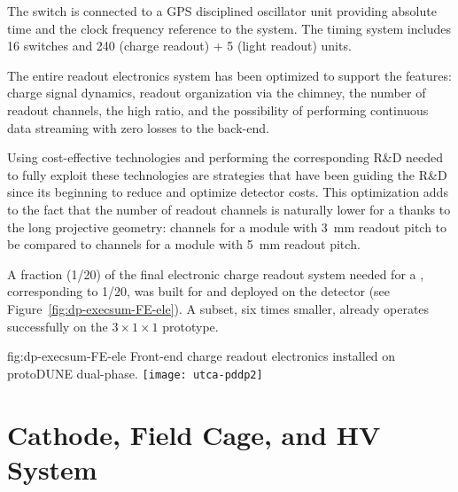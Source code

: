 The  switch is connected to a GPS disciplined oscillator unit providing absolute time and the clock frequency reference to the system. The timing system includes \num{16}  switches and \num{240} (charge readout) + \num{5} (light readout)  units.    

The entire readout electronics system has been optimized to support the  features: charge signal dynamics, readout organization via the chimney, the number of readout channels, the high  ratio, and the possibility of performing continuous data streaming with zero losses to the  back-end. 

Using cost-effective technologies and performing the corresponding R\&D needed to fully exploit these technologies are strategies that have been guiding the R\&D since its beginning to reduce and optimize detector costs.   
This optimization adds to the fact that the number of readout channels is naturally lower for a  thanks to the long projective geometry: \dpnumcrpch channels for a  module with \SI{3}{mm} readout pitch to be compared to \spnumch channels for a  module with \SI{5}{mm} readout pitch. 

A fraction (1/20) of the final electronic charge readout system needed for a   , corresponding to 1/20, was built for  and deployed on the detector (see Figure~\ref{fig:dp-execsum-FE-ele}).  A subset, six times smaller, already operates successfully  on the $3\times 1 \times 1$ prototype.

\begin{dunefigure}{fig:dp-execsum-FE-ele}
  {Front-end charge readout electronics installed on protoDUNE dual-phase.}
  \texttt{[image: utca-pddp2]}
\end{dunefigure}


\section{Cathode, Field Cage, and HV System}
\label{sec:dp-execsum-cathode}

